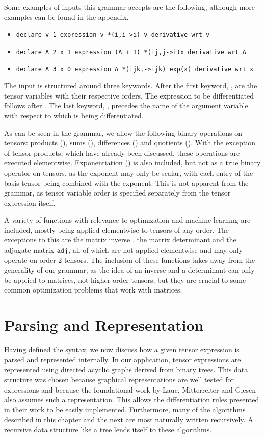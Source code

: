 \documentclass[12pt, a4paper]{report}
\begin{document}
Some examples of inputs this grammar accepts are the following, although more examples can be found in the appendix.

\begin{itemize}
    \item \texttt{declare v 1 expression v *(i,i->i) v derivative wrt v}
    \item \texttt{declare A 2 x 1 expression (A + 1) *(ij,j->i)x derivative wrt A}
    \item \texttt{declare A 3 x 0 expression A *(ijk,->ijk) exp(x) derivative wrt x}
\end{itemize}

The input is structured around three keywords.
After the first keyword, , are the tensor variables with their respective orders.
The expression to be differentiated follows after .
The last keyword, , precedes the name of the argument variable with respect to which is being differentiated.

As can be seen in the grammar, we allow the following binary operations on tensors: products (\codeword{*(,->)}), sums (\codeword{+}), differences (\codeword{-}) and quotients (\codeword{/}).
With the exception of tensor products, which have already been discussed, these operations are executed elementwise.
Exponentiation (\codeword{^}) is also included, but not as a true binary operator on tensors, as the exponent may only be scalar, with each entry of the basis tensor being combined with the exponent.
This is not apparent from the grammar, as tensor variable order is specified separately from the tensor expression itself.

A variety of functions with relevance to optimization and machine learning are included, mostly being applied elementwise to tensors of any order.
The exceptions to this are the matrix inverse , the matrix determinant  and the adjugate matrix $\codeword{adj}$, all of which are not applied elementwise and may only operate on order 2 tensors.
The inclusion of these functions takes away from the generality of our grammar, as the idea of an inverse and a determinant can only be applied to matrices, not higher-order tensors, but they are crucial to some common optimization problems that work with matrices.

\chapter{Parsing and Representation}
Having defined the syntax, we now discuss how a given tensor expression is parsed and represented internally.
In our application, tensor expressions are represented using directed acyclic graphs derived from binary trees.
This data structure was chosen because graphical representations are well tested for expressions and because the foundational work by Laue, Mitterreiter and Giesen also assumes such a representation.
This allows the differentiation rules presented in their work to be easily implemented.
Furthermore, many of the algorithms described in this chapter and the next are most naturally written recursively.
A recursive data structure like a tree lends itself to these algorithms.
\end{document}
